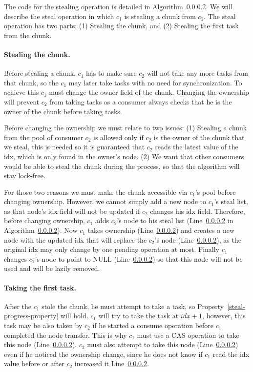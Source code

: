 The code for the stealing operation is detailed in Algorithm~\ref{}. We will describe the steal operation in which $c_1$ is stealing a chunk from $c_2$. The steal operation has two parts: (1) Stealing the chunk, and (2) Stealing the first task from the chunk.

\paragraph{Stealing the chunk.} Before stealing a chunk, $c_1$ has to make sure $c_2$ will not take any more tasks from that chunk, so the $c_1$ may later take tasks with no need for synchronization. To achieve this $c_1$ must change the owner field of the chunk. Changing the ownership will prevent $c_2$ from taking tasks as a consumer always checks that he is the owner of the chunk before taking tasks. 

Before changing the ownership we must relate to two issues: (1) Stealing a chunk from the pool of consumer $c_2$ is allowed only if $c_2$ is the owner of the chunk that we steal, this is needed so it is guaranteed that $c_2$ reads the latest value of the idx, which is only found in the owner's node. (2) We want that other consumers would be able to steal the chunk during the process, so that the algorithm will stay lock-free. 

For those two reasons we must make the chunk accessible via $c_1$'s pool before changing ownership. However, we cannot simply add a new node to $c_1$'s steal list, as that node's idx field will not be updated if $c_2$ changes his idx field. Therefore, before changing ownership, $c_1$ adds $c_2$'s node to his steal list (Line~\ref{} in Algorithm~\ref{}). Now $c_1$ takes ownership (Line~\ref{}) and creates a new node with the updated idx that will replace the $c_2$'s node (Line~\ref{}), as the original idx may only change by one pending operation at most. Finally $c_1$ changes $c_2$'s node to point to NULL (Line~\ref{}) so that this node will not be used and will be lazily removed.

\paragraph{Taking the first task.} After the $c_1$ stole the chunk, he must attempt to take a task, so Property~\ref{steal-progress-property} will hold. $c_1$ will try to take the task at $idx+1$, however, this task may be also taken by $c_2$ if he started a consume operation before $c_1$ completed the node transfer. This is why $c_1$ must use a CAS operation to take this node (Line~\ref{}). $c_2$ must also attempt to take this node (Line~\ref{}) even if he noticed the ownership change, since he does not know if $c_1$ read the idx value before or after $c_2$ increased it Line~\ref{}.

